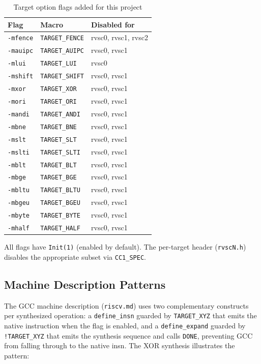 \begin{table}[htb]
\centering
\caption{Target option flags added for this project}
\label{tab:target-flags}
\begin{tabular}{lll}
\toprule
\textbf{Flag} & \textbf{Macro} & \textbf{Disabled for} \\
\midrule
\texttt{-mfence}  & \texttt{TARGET\_FENCE}  & rvsc0, rvsc1, rvsc2 \\
\texttt{-mauipc}  & \texttt{TARGET\_AUIPC}  & rvsc0, rvsc1 \\
\texttt{-mlui}    & \texttt{TARGET\_LUI}    & rvsc0 \\
\texttt{-mshift}  & \texttt{TARGET\_SHIFT}  & rvsc0, rvsc1 \\
\texttt{-mxor}    & \texttt{TARGET\_XOR}    & rvsc0, rvsc1 \\
\texttt{-mori}    & \texttt{TARGET\_ORI}    & rvsc0, rvsc1 \\
\texttt{-mandi}   & \texttt{TARGET\_ANDI}   & rvsc0, rvsc1 \\
\texttt{-mbne}    & \texttt{TARGET\_BNE}    & rvsc0, rvsc1 \\
\texttt{-mslt}    & \texttt{TARGET\_SLT}    & rvsc0, rvsc1 \\
\texttt{-mslti}   & \texttt{TARGET\_SLTI}   & rvsc0, rvsc1 \\
\texttt{-mblt}    & \texttt{TARGET\_BLT}    & rvsc0, rvsc1 \\
\texttt{-mbge}    & \texttt{TARGET\_BGE}    & rvsc0, rvsc1 \\
\texttt{-mbltu}   & \texttt{TARGET\_BLTU}   & rvsc0, rvsc1 \\
\texttt{-mbgeu}   & \texttt{TARGET\_BGEU}   & rvsc0, rvsc1 \\
\texttt{-mbyte}   & \texttt{TARGET\_BYTE}   & rvsc0, rvsc1 \\
\texttt{-mhalf}   & \texttt{TARGET\_HALF}   & rvsc0, rvsc1 \\
\bottomrule
\end{tabular}
\end{table}

All flags have \texttt{Init(1)} (enabled by default). The per-target header (\texttt{rvscN.h})
disables the appropriate subset via \texttt{CC1\_SPEC}.

\subsection{Machine Description Patterns} \label{sec:sc1-md}

The GCC machine description (\texttt{riscv.md}) uses two complementary constructs per synthesized
operation: a \texttt{define\_insn} guarded by \texttt{TARGET\_XYZ} that emits the native instruction
when the flag is enabled, and a \texttt{define\_expand} guarded by \texttt{!TARGET\_XYZ} that emits
the synthesis sequence and calls \texttt{DONE}, preventing GCC from falling through to the native
insn. The XOR synthesis illustrates the pattern:

